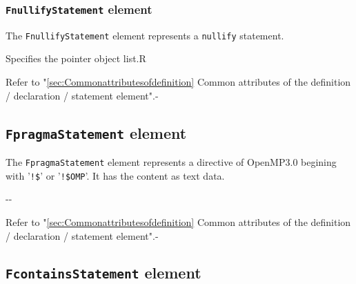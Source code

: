 \subsubsection{ {\tt FnullifyStatement} element}

The {\tt FnullifyStatement} element represents a {\tt nullify} statement.


\begin{XcodeMLChildElements}
{Specifies the pointer object list.}{R}
\end{XcodeMLChildElements}

\begin{XcodeMLAttributes}
{Refer to "\ref{sec:Commonattributesofdefinition} Common attributes of the definition / declaration / statement element".}{-}
\end{XcodeMLAttributes}


\subsection{ {\tt FpragmaStatement} element}

The {\tt FpragmaStatement} element represents a directive of OpenMP3.0 begining with ’{\tt !\$}’ or ’{\tt !\$OMP}’.
It has the content as text data.


\begin{XcodeMLChildElements}
\XcodeMLElementDef{-}
{-}{-}
\end{XcodeMLChildElements}

\begin{XcodeMLAttributes}
{Refer to "\ref{sec:Commonattributesofdefinition} Common attributes of the definition / declaration / statement element".}{-}
\end{XcodeMLAttributes}


\subsection{ {\tt FcontainsStatement} element}

